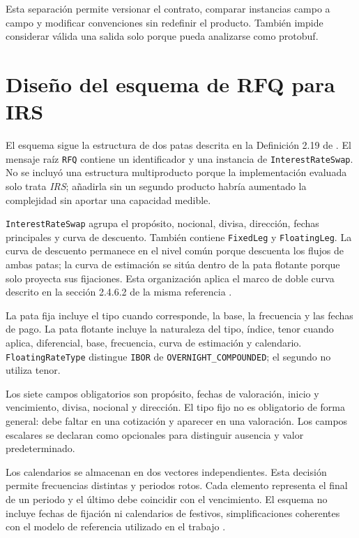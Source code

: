 Esta separación permite versionar el contrato, comparar instancias campo a campo y modificar convenciones sin redefinir el producto. También impide considerar válida una salida solo porque pueda analizarse como protobuf.

\section{Diseño del esquema de RFQ para IRS}
\label{sec:diseno_esquema_irs}

El esquema sigue la estructura de dos patas descrita en la Definición 2.19 de \textcite[p.~59]{ausin2025quantitative}. El mensaje raíz \texttt{RFQ} contiene un identificador y una instancia de \texttt{InterestRateSwap}. No se incluyó una estructura multiproducto porque la implementación evaluada solo trata \textit{IRS}; añadirla sin un segundo producto habría aumentado la complejidad sin aportar una capacidad medible.

\texttt{InterestRateSwap} agrupa el propósito, nocional, divisa, dirección, fechas principales y curva de descuento. También contiene \texttt{FixedLeg} y \texttt{FloatingLeg}. La curva de descuento permanece en el nivel común porque descuenta los flujos de ambas patas; la curva de estimación se sitúa dentro de la pata flotante porque solo proyecta sus fijaciones. Esta organización aplica el marco de doble curva descrito en la sección 2.4.6.2 de la misma referencia \citep[sec.~2.4.6.2]{ausin2025quantitative}.

La pata fija incluye el tipo cuando corresponde, la base, la frecuencia y las fechas de pago. La pata flotante incluye la naturaleza del tipo, índice, tenor cuando aplica, diferencial, base, frecuencia, curva de estimación y calendario. \texttt{FloatingRateType} distingue \texttt{IBOR} de \texttt{OVERNIGHT\_COMPOUNDED}; el segundo no utiliza tenor.

Los siete campos obligatorios son propósito, fechas de valoración, inicio y vencimiento, divisa, nocional y dirección. El tipo fijo no es obligatorio de forma general: debe faltar en una cotización y aparecer en una valoración. Los campos escalares se declaran como opcionales para distinguir ausencia y valor predeterminado.

Los calendarios se almacenan en dos vectores independientes. Esta decisión permite frecuencias distintas y periodos rotos. Cada elemento representa el final de un periodo y el último debe coincidir con el vencimiento. El esquema no incluye fechas de fijación ni calendarios de festivos, simplificaciones coherentes con el modelo de referencia utilizado en el trabajo \citep[p.~63]{ausin2025quantitative}.

